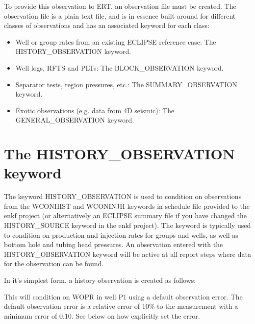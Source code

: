 \documentclass[letterpaper,10pt,english]{sphinxmanual}
\begin{document}
To provide this observation to ERT, an observation file must be
created. The observation file is a plain text file, and is in essence
built around for different classes of observations and has an
associated keyword for each class:
\begin{itemize}
\item {} 
Well or group rates from an existing ECLIPSE reference case: The
HISTORY\_OBSERVATION keyword.

\item {} 
Well logs, RFTS and PLTs: The BLOCK\_OBSERVATION keyword.

\item {} 
Separator tests, region pressures, etc.: The SUMMARY\_OBSERVATION
keyword.

\item {} 
Exotic observations (e.g. data from 4D seismic): The
GENERAL\_OBSERVATION keyword.

\end{itemize}


\section{The HISTORY\_OBSERVATION keyword}
\label{\detokenize{observations/index:the-history-observation-keyword}}
The keyword HISTORY\_OBSERVATION is used to condition on observations
from the WCONHIST and WCONINJH keywords in schedule file provided to
the enkf project (or alternatively an ECLIPSE summary file if you have
changed the HISTORY\_SOURCE keyword in the enkf project). The keyword
is typically used to condition on production and injection rates for
groups and wells, as well as bottom hole and tubing head pressures. An
observation entered with the HISTORY\_OBSERVATION keyword will be
active at all report steps where data for the observation can be
found.

In it’s simplest form, a history observation is created as follows:

%
\begin{sphinxVerbatim}[commandchars=\\\{\}]
 
\end{sphinxVerbatim}

This will condition on WOPR in well P1 using a default observation
error. The default observation error is a relative error of 10\% to the
measurement with a minimum error of 0.10. See below on how explicitly
set the error.
\end{document}
